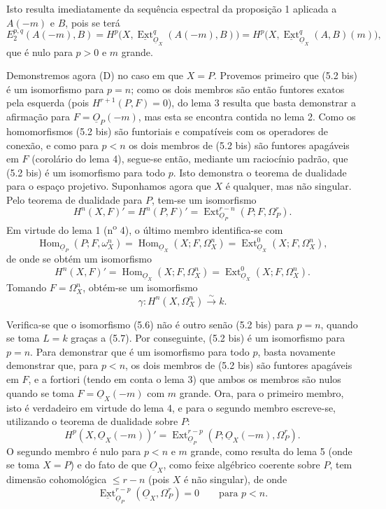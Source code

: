 \documentclass[11pt,twoside,openany]{book}
\numberwithin{equation}{section}
\newcommand{\src}[1]{%
  \phantomsection\hypertarget{src:#1}{}%
  \marginpar{\raggedleft\footnotesize\sffamily #1}%
}
\newcommand{\Osh}{\underline{O}}
\newcommand{\Extsh}{\underline{\operatorname{Ext}}}
\theoremstyle{plain}
\theoremstyle{definition}
\theoremstyle{remark}
\newcommand{\FgaUnitKey}{frontmatter}
\renewcommand{\src}[1]{%
  \phantomsection\hypertarget{src:\FgaUnitKey:#1}{}%
  \marginpar{\raggedleft\footnotesize\sffamily #1}%
}
\begin{document}
Isto resulta imediatamente da sequência espectral da proposição 1 aplicada a
$A(-m)$ e $B$, pois se terá
\[
  E_{2}^{p,q}(A(-m),B)
  =H^{p}\bigl(X,\Extsh_{\Osh_X}^{q}(A(-m),B)\bigr)
  =H^{p}\bigl(X,\Extsh_{\Osh_X}^{q}(A,B)(m)\bigr),
\]
que é nulo para $p>0$ e $m$ grande.

Demonstremos agora (D) no caso em que $X=P$. Provemos primeiro que (5.2 bis)
é um isomorfismo para $p=n$; como os dois membros são então
funtores exatos pela esquerda (pois $H^{r+1}(P,F)=0$), do lema 3 resulta
que basta demonstrar a afirmação para $F=\Osh_P(-m)$, mas esta se encontra
contida no lema 2. Como os homomorfismos (5.2 bis) são funtoriais e
compatíveis com os operadores de conexão, e como para $p<n$ os dois membros de
(5.2 bis) são funtores apagáveis em $F$ (corolário do lema 4), segue-se
então, mediante um raciocínio padrão, que (5.2 bis) é um isomorfismo
para todo $p$. Isto demonstra o teorema de dualidade para o espaço projetivo.
Suponhamos agora que $X$ é qualquer, mas não singular. Pelo teorema de
dualidade para $P$, tem-se um isomorfismo
\[
  H^{n}(X,F)'=H^{n}(P,F)'
  =\operatorname{Ext}_{\Osh_P}^{r-n}(P;F,\Omega_P^{r}).
\]
Em virtude do lema 1 (n\textsuperscript{o} 4), o último membro identifica-se com
\[
  \operatorname{Hom}_{\Osh_P}(P;F,\omega_X^{n})
  =\operatorname{Hom}_{\Osh_X}(X;F,\Omega_X^{n})
  =\operatorname{Ext}_{\Osh_X}^{0}(X;F,\Omega_X^{n}),
\]
de onde se obtém um isomorfismo
\begin{equation}\tag{5.6}
  H^{n}(X,F)'=\operatorname{Hom}_{\Osh_X}(X;F,\Omega_X^{n})
  =\operatorname{Ext}_{\Osh_X}^{0}(X;F,\Omega_X^{n}).
\end{equation}
Tomando $F=\Omega_X^{n}$, obtém-se um isomorfismo
\begin{equation}\tag{5.7}
  \gamma:H^{n}(X,\Omega_X^{n})\xrightarrow{\sim}k.
\end{equation}

\src{185}
Verifica-se que o isomorfismo (5.6) não é outro senão (5.2 bis) para $p=n$, quando
se toma $L=k$ graças a (5.7). Por conseguinte, (5.2 bis) é um isomorfismo para
$p=n$. Para demonstrar que é um isomorfismo para todo $p$, basta novamente
demonstrar que, para $p<n$, os dois membros de (5.2 bis) são funtores
apagáveis em $F$, e a fortiori (tendo em conta o lema 3) que ambos os membros
são nulos quando se toma $F=\Osh_X(-m)$ com $m$ grande. Ora, para o primeiro
membro, isto é verdadeiro em virtude do lema 4, e para o segundo membro escreve-se,
utilizando o teorema de dualidade sobre $P$:
\[
  H^{p}(X,\Osh_X(-m))'
  =\operatorname{Ext}_{\Osh_P}^{r-p}
    (P;\Osh_X(-m),\Omega_P^{r}).
\]
O segundo membro é nulo para $p<n$ e $m$ grande, como resulta do lema 5
(onde se toma $X=P$) e do fato de que $\Osh_X$, como feixe algébrico
coerente sobre $P$, tem dimensão cohomológica $\leq r-n$ (pois $X$ é não
singular), de onde
\[
  \Extsh_{\Osh_P}^{r-p}(\Osh_X,\Omega_P^{r})=0
  \qquad\text{para }p<n.
\]
\end{document}

